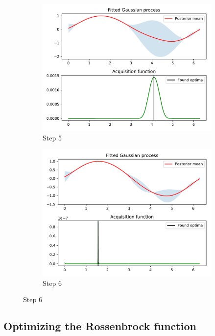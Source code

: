 \documentclass[10pt,a4paper,twoside]{book}
\begin{document}
\begin{figure}
	\begin{subfigure}[b]{0.45\textwidth}
		\caption{Step 5}
		\includegraphics[width=\textwidth]{figures/chapter3/sine/4.pdf}
	\end{subfigure}
	\begin{subfigure}[b]{0.45\textwidth}
		\caption{Step 6}
		\includegraphics[width=\textwidth]{figures/chapter3/sine/5.pdf}
	\end{subfigure}
\end{figure}


\subsection{Optimizing the Rossenbrock function}
\end{document}
